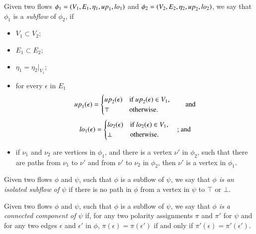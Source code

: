 \begin{definition}\label{definition:Subflow}
Given two flows $\phi_1=(V_1,E_1,\eta_1,{\mathit up}_1,{\mathit lo}_1)$ and $\phi_2=(V_2,E_2,\eta_2,{\mathit up}_2,{\mathit lo}_2)$, we say that $\phi_1$ is a \emph{subflow} of $\phi_2$, if
\begin{itemize}
\item $V_1\subset V_2$;
\item $E_1\subset E_2$;
\item $\eta_1=\eta_2|_{V_1}$;
\item for every $\epsilon$ in $E_1$
\[
{\mathit up}_1(\epsilon)=
\begin{cases}
{\mathit up}_2(\epsilon) & \mbox{if ${\mathit up}_2(\epsilon)\in V_1$,}
\\
\top & \mbox{otherwise.}
\end{cases}
\qquad\mbox{and}
\]
\[
{\mathit lo}_1(\epsilon)=
\begin{cases}
{\mathit lo}_2(\epsilon) & \mbox{if ${\mathit lo}_2(\epsilon)\in V_1$,}
\\
\bot & \mbox{otherwise.}
\end{cases}\quad\mbox{; and}
\]
\item
if $\nu_1$ and $\nu_2$ are vertices in $\phi_1$, and there is a vertex $\nu'$ in $\phi_2$, such that there are paths from $\nu_1$ to $\nu'$ and from $\nu'$ to $\nu_2$ in $\phi_2$, then $\nu'$ is a vertex in $\phi_1$.
\end{itemize}
\end{definition}


\begin{definition}\label{defintion:IsolatedSubflow}
Given two flows $\phi$ and $\psi$, such that $\phi$ is a subflow of $\psi$, we say that \emph{$\phi$ is an isolated subflow of $\psi$} if there is no path in $\phi$ from a vertex in $\psi$ to $\top$ or $\bot$.
\end{definition}

\begin{definition}\label{definition:ConnectedComponent}
Given two flows $\phi$ and $\psi$, such that $\phi$ is a subflow of $\psi$, we say that \emph{$\phi$ is a connected component of $\psi$} if, for any two polarity assignments $\pi$ and $\pi'$ for $\psi$ and for any two edges $\epsilon$ and $\epsilon'$ in $\phi$, $\pi(\epsilon)=\pi(\epsilon')$ if and only if $\pi'(\epsilon)=\pi'(\epsilon')$.
\end{definition}
